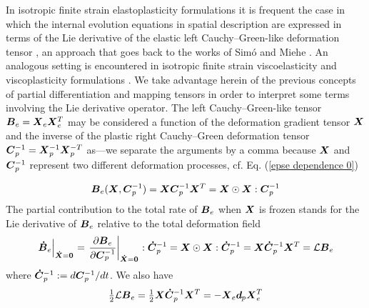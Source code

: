 \documentclass[preprint,review,12pt,sort&compress]{elsarticle}%
\newcommand{\xdo}[0]{\scriptsize\mathbf{\dot X} = \mathbf{0}\normalsize\mathbf{}}
\renewcommand{\mathbf}[1]{\mbox{\boldmath $#1$ \unboldmath}  \!\!}
\begin{document}
In isotropic finite strain elastoplasticity formulations it is frequent the
case in which the internal evolution equations in spatial description are
expressed in terms of the Lie derivative of the elastic left
Cauchy--Green-like deformation tensor \cite{PericDettmer03,BonetWoodBook}, an
approach that goes back to the works of Sim\'{o} and Miehe
\cite{SimoMiehe92,Simo92}. An analogous setting is encountered in isotropic
finite strain viscoelasticity and viscoplasticity formulations
\cite{ReeseGovindjee98,PericDettmer03,HolmesLougram10}. We take advantage
herein of the previous concepts of partial differentiation and mapping tensors
in order to interpret some terms involving the Lie derivative operator. The
left Cauchy--Green-like tensor $\mathbf{B}_{e}=\mathbf{X}_{e}\mathbf{X}%
_{e}^{T}$ may be considered a function of the deformation gradient tensor
$\mathbf{X}$ and the inverse of the plastic right Cauchy--Green deformation
tensor $\mathbf{C}_{p}^{-1}=\mathbf{X}_{p}^{-1}\mathbf{X}_{p}^{-T}$ as---we
separate the arguments by a comma because $\mathbf{X}$ and $\mathbf{C}%
_{p}^{-1}$ represent two different deformation processes, cf. Eq.
(\ref{epse dependence 0})%

\begin{equation}
\mathbf{B}_{e}(\mathbf{X},\mathbf{C}_{p}^{-1})=\mathbf{XC}_{p}^{-1}%
\mathbf{X}^{T}=\mathbf{X}\odot\mathbf{X}:\mathbf{C}_{p}^{-1}%
\end{equation}
The partial contribution to the total rate of $\mathbf{B}_{e}$ when
$\mathbf{X}$ is frozen stands for the Lie derivative of $\mathbf{B}_{e}$
relative to the total deformation field \cite{LatMonCM2015}%
\begin{equation}
\left.  \mathbf{\dot{B}}_{e}\right\vert _{%
\xdo
}=\left.  \frac{\partial\mathbf{B}_{e}}{\partial\mathbf{C}_{p}^{-1}%
}\right\vert _{%
\xdo
}:\mathbf{\dot{C}}_{p}^{-1}=\mathbf{X}\odot\mathbf{X}:\mathbf{\dot{C}}%
_{p}^{-1}=\mathbf{X\dot{C}}_{p}^{-1}\mathbf{X}^{T}=\mathcal{L}\mathbf{B}_{e}%
\end{equation}
where $\mathbf{\dot{C}}_{p}^{-1}:=d\mathbf{C}_{p}^{-1}/dt$. We also have%
\begin{equation}
\tfrac{1}{2}\mathcal{L}\mathbf{B}_{e}=\tfrac{1}{2}\mathbf{X\dot{C}}_{p}%
^{-1}\mathbf{X}^{T}=-\mathbf{X}_{e}\mathbf{\mathbf{d}}_{p}\mathbf{X}_{e}^{T}%
\end{equation}
\end{document}
